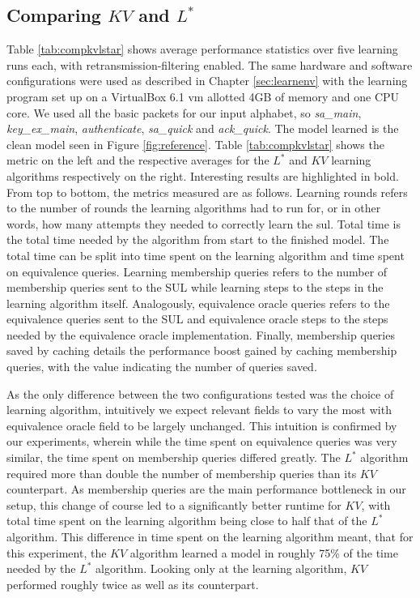\subsection{Comparing $KV$ and $L^*$} \label{subsec:comp_kv_lstar}
Table \ref{tab:compkvlstar} shows average performance statistics over five learning runs each, with retransmission-filtering enabled. The same hardware and software configurations were used as described in Chapter \ref{sec:learnenv} with the learning program set up on a VirtualBox 6.1 \ac{vm} allotted 4GB of memory and one CPU core. We used all the basic packets for our input alphabet, so
\emph{sa\_main}, \emph{key\_ex\_main}, \emph{authenticate}, \emph{sa\_quick} and \emph{ack\_quick}. The model learned is the clean model seen in Figure \ref{fig:reference}. Table \ref{tab:compkvlstar} shows the metric on the left and the respective averages for the $L^*$ and $KV$ learning algorithms respectively on the right. Interesting results are highlighted in bold. From top to bottom, the metrics measured are as follows.
Learning rounds refers to the number of rounds the learning algorithms had to run for, or in other words, how many attempts they needed to correctly learn the \ac{sul}. Total time is the total time needed by the algorithm from start to the finished model. The total time can be split into time spent on the learning algorithm and time spent on equivalence queries. Learning membership queries refers to the number of membership queries sent to the SUL while learning steps to the steps in the learning algorithm itself. Analogously, equivalence oracle queries refers to the equivalence queries sent to the SUL and equivalence oracle steps to the steps needed by the equivalence oracle implementation. Finally, membership queries saved by caching details the performance boost gained by caching membership queries, with the value indicating the number of queries saved.

As the only difference between the two configurations tested was the choice of learning algorithm, intuitively we expect relevant fields to vary the most with equivalence oracle field to be largely unchanged. This intuition is confirmed by our experiments, wherein while the time spent on equivalence queries was very similar, the time spent on membership queries differed greatly. The $L^*$ algorithm required more than double the number of membership queries than its $KV$ counterpart. As membership queries are the main performance bottleneck in our setup, this change of course led to a significantly better runtime for $KV$, with total time spent on the learning algorithm being close to half that of the $L^*$ algorithm. This difference in time spent on the learning algorithm meant, that for this experiment, the $KV$ algorithm learned a model in roughly 75\% of the time needed by the $L^*$ algorithm. Looking only at the learning algorithm, $KV$ performed roughly twice as well as its counterpart.


